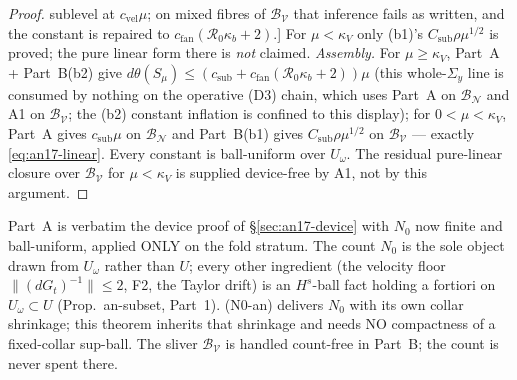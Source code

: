 \begin{proof}
{sublevel at $c_{\mathrm{vel}}\mu$; on mixed fibres of $\mathcal B_{\mathcal V}$
that inference fails as written, and the constant is repaired to
$c_{\mathrm{fan}}(\mathcal R_0\kappa_b+2)$.]} For $\mu<\kappa_V$ only
(b1)'s $C_{\mathrm{sub}}\rho\mu^{1/2}$ is proved; the pure linear form there is
\emph{not} claimed. \emph{Assembly.} For $\mu\ge\kappa_V$, Part~A + Part~B(b2) give
$d\theta(S_\mu)\le(c_{\mathrm{sub}}+c_{\mathrm{fan}}(\mathcal R_0\kappa_b+2))\mu$
(this whole-$\Sigma_y$ line is consumed by nothing on the operative (D3) chain,
which uses Part~A on $\mathcal B_{\mathcal N}$ and A1 on
$\mathcal B_{\mathcal V}$; the (b2) constant inflation is confined to this
display); for $0<\mu<\kappa_V$, Part~A gives
$c_{\mathrm{sub}}\mu$ on $\mathcal B_{\mathcal N}$ and Part~B(b1) gives
$C_{\mathrm{sub}}\rho\mu^{1/2}$ on $\mathcal B_{\mathcal V}$ --- exactly
\eqref{eq:an17-linear}. Every constant is ball-uniform over $U_\omega$. The
residual pure-linear closure over $\mathcal B_{\mathcal V}$ for $\mu<\kappa_V$ is
supplied device-free by A1, not by this argument.
\end{proof}

\begin{remark}
\label{an17:rem-linput}
Part~A is verbatim the device proof of \S\ref{sec:an17-device} with $N_0$ now
finite and ball-uniform, applied ONLY on the fold stratum. The count $N_0$ is the
sole object drawn from $U_\omega$ rather than $U$; every other ingredient (the
velocity floor $\|(dG_t)^{-1}\|\le2$, F2, the Taylor drift) is an $H^s$-ball fact
holding a fortiori on $U_\omega\subset U$ (Prop.~an-subset, Part~1). (N0-an)
delivers $N_0$ with its own collar shrinkage; this theorem inherits that shrinkage
and needs NO compactness of a fixed-collar sup-ball. The sliver
$\mathcal B_{\mathcal V}$ is handled count-free in Part~B; the count is never spent
there.
\end{remark}

